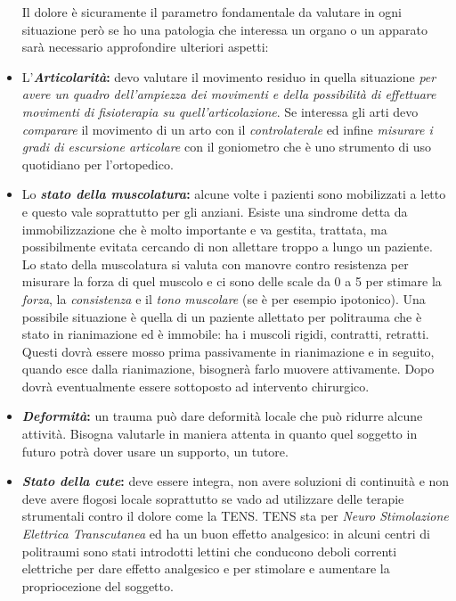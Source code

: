 \begin{itemize}
Il dolore è sicuramente il parametro fondamentale da valutare in ogni situazione però se ho una patologia che interessa un organo o un apparato sarà necessario approfondire ulteriori aspetti:

\item
  L'\textbf{\emph{Articolarità}:} devo valutare il movimento residuo in quella situazione \emph{per avere un quadro dell'ampiezza dei movimenti e della possibilità di effettuare movimenti di fisioterapia su quell'articolazione}. Se interessa gli arti devo \emph{comparare} il movimento di un arto con il \emph{controlaterale} ed infine \emph{misurare i gradi di escursione articolare} con il goniometro che è uno strumento di uso quotidiano per l'ortopedico.
\item
  Lo \textbf{\emph{stato della muscolatura}:} alcune volte i pazienti sono mobilizzati a letto e questo vale soprattutto per gli anziani.
  Esiste una sindrome detta da immobilizzazione che è molto importante e va gestita, trattata, ma possibilmente evitata cercando di non allettare troppo a lungo un paziente. Lo stato della muscolatura si valuta con manovre contro resistenza per misurare la forza di quel muscolo e ci sono delle scale da 0 a 5 per stimare la \emph{forza}, la \emph{consistenza} e il \emph{tono muscolare} (se è per esempio ipotonico). Una possibile situazione è quella di un paziente allettato per politrauma che è stato in rianimazione ed è immobile: ha i muscoli rigidi, contratti, retratti. Questi dovrà essere mosso prima passivamente in rianimazione e in seguito, quando esce dalla rianimazione, bisognerà farlo muovere attivamente. Dopo dovrà eventualmente essere sottoposto ad intervento chirurgico.
\item
  \textbf{\emph{Deformità}:} un trauma può dare deformità locale che può ridurre alcune attività. Bisogna valutarle in maniera attenta in quanto quel soggetto in futuro potrà dover usare un supporto, un tutore.
\item
  \textbf{\emph{Stato della cute}:} deve essere integra, non avere soluzioni di continuità e non deve avere flogosi locale soprattutto se vado ad utilizzare delle terapie strumentali contro il dolore come la TENS. TENS sta per \emph{Neuro Stimolazione Elettrica Transcutanea} ed ha un buon effetto analgesico: in alcuni centri di politraumi sono stati introdotti lettini che conducono deboli correnti elettriche per dare effetto analgesico e per stimolare e aumentare la propriocezione del soggetto.
\end{itemize}

